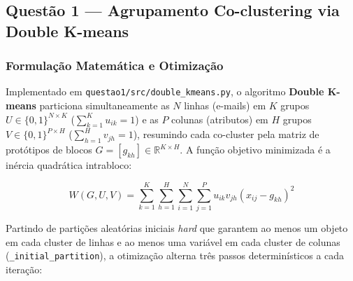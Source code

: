 \documentclass[a4paper,11pt]{article}
\begin{document}
\subsection{Questão 1 --- Agrupamento Co-clustering via Double K-means}\label{sec:2-1-questao-1-agrupamento-co-clustering-via-double-k-means}


\subsubsection{Formulação Matemática e Otimização}\label{sec:2-1-1-formulacao-matematica-e-otimizacao}


Implementado em \texttt{questao1/\allowbreak src/\allowbreak double\_\allowbreak kmeans.py}, o algoritmo \textbf{Double K-means} particiona simultaneamente as $N$ linhas (e-mails) em $K$ grupos $U \in \{0,1\}^{N \times K}$ ($\sum_{k=1}^K u_{ik} = 1$) e as $P$ colunas (atributos) em $H$ grupos $V \in \{0,1\}^{P \times H}$ ($\sum_{h=1}^H v_{jh} = 1$), resumindo cada co-cluster pela matriz de protótipos de blocos $G = [g_{kh}] \in \mathbb{R}^{K \times H}$. A função objetivo minimizada é a inércia quadrática intrabloco:

\[
W(G, U, V) = \sum_{k=1}^{K} \sum_{h=1}^{H} \sum_{i=1}^{N} \sum_{j=1}^{P} u_{ik} v_{jh} (x_{ij} - g_{kh})^2
\]

Partindo de partições aleatórias iniciais \textit{hard} que garantem ao menos um objeto em cada cluster de linhas e ao menos uma variável em cada cluster de colunas (\texttt{\_\allowbreak initial\_\allowbreak partition}), a otimização alterna três passos determinísticos a cada iteração:
\end{document}
